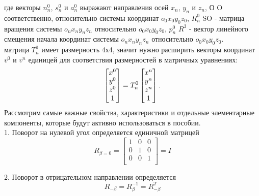 \hspace*{\parindent} где векторы  $n_n^0$,  $s_n^0$ и $a_n^0$ выражают направления осей $x_n$, $y_n$ и $z_n$, О O соответственно, относительно системы координат $o_0 x_0 y_0 z_0$, $R_n^0$ \in SO - матрица вращения системы  $o_n x_n y_n z_n$ относительно $o_0 x_0 y_0 z_0$, $p_n^0$ \in $R^3$ - вектор линейного смещения начала координат системы  $o_n x_n y_n z_n$ относительно $o_0 x_0 y_0 z_0$.\\
\hspace*{\parindent} матрица $T_n^0$ имеет размерность 4х4, значит нужно расширить векторы координат $v^0$ и $v^n$ единицей для соответствия размерностей в матричных уравнениях:\\
\begin{equation}\label{eq:model}
     \begin{bmatrix}
     x^0 \\
     y^0\\
     z^0\\
     1\\
    \end{bmatrix}
     =T_n^0
     \begin{bmatrix}
     x^n \\
     y^n\\
     z^n\\
     1\\
    \end{bmatrix}
    .\\
\end{equation} 
\hspace*{\parindent} Рассмотрим самые важные свойства, характеристики и отдельные элементарные компоненты, которые будут активно использоваться в пособии.\\

1. Поворот на нулевой угол определяется единичной матрицей\\
\begin{equation}\label{eq:model}
R_{\beta=0} = 
     \begin{bmatrix}
    1 & 0 & 0\\
    0 & 1 & 0\\
    0 & 0 & 1\\
    \end{bmatrix}
     =I
\end{equation} 

2. Поворот в отрицательном направлении определяется
\begin{equation}\label{eq:model}
R_{-\beta} = R_{\beta}^{-1} = R_{-\beta}^T
\end{equation} 

